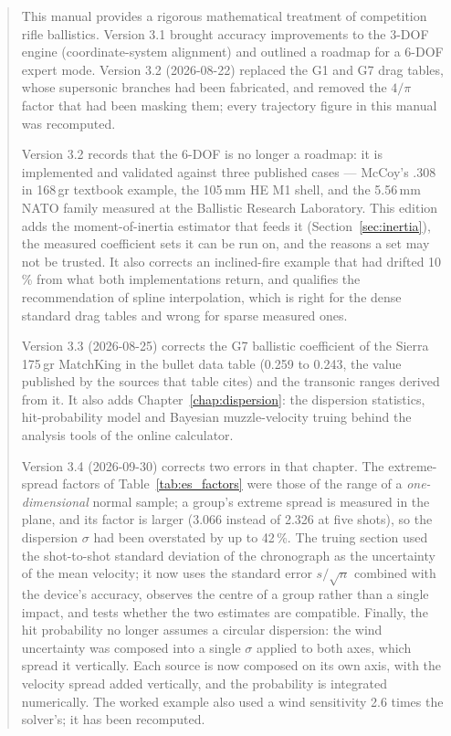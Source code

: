 \documentclass[11pt,twoside,openright]{report}
\begin{document}
\begin{abstract}
This manual provides a rigorous mathematical treatment of competition rifle ballistics. Version 3.1 brought accuracy improvements to the 3-DOF engine (coordinate-system alignment) and outlined a roadmap for a 6-DOF expert mode. Version 3.2 (2026-08-22) replaced the G1 and G7 drag tables, whose supersonic branches had been fabricated, and removed the $4/\pi$ factor that had been masking them; every trajectory figure in this manual was recomputed.

Version 3.2 records that the 6-DOF is no longer a roadmap: it is implemented and validated against three published cases --- McCoy's .308\,in 168\,gr textbook example, the 105\,mm HE M1 shell, and the 5.56\,mm NATO family measured at the Ballistic Research Laboratory. This edition adds the moment-of-inertia estimator that feeds it (Section~\ref{sec:inertia}), the measured coefficient sets it can be run on, and the reasons a set may not be trusted. It also corrects an inclined-fire example that had drifted 10\,\% from what both implementations return, and qualifies the recommendation of spline interpolation, which is right for the dense standard drag tables and wrong for sparse measured ones.

Version 3.3 (2026-08-25) corrects the G7 ballistic coefficient of the Sierra 175\,gr MatchKing in the bullet data table (0.259 to 0.243, the value published by the sources that table cites) and the transonic ranges derived from it. It also adds Chapter~\ref{chap:dispersion}: the dispersion statistics, hit-probability model and Bayesian muzzle-velocity truing behind the analysis tools of the online calculator.

Version 3.4 (2026-09-30) corrects two errors in that chapter. The extreme-spread factors of Table~\ref{tab:es_factors} were those of the range of a \emph{one-dimensional} normal sample; a group's extreme spread is measured in the plane, and its factor is larger (3.066 instead of 2.326 at five shots), so the dispersion $\sigma$ had been overstated by up to 42\,\%. The truing section used the shot-to-shot standard deviation of the chronograph as the uncertainty of the mean velocity; it now uses the standard error $s/\sqrt{n}$ combined with the device's accuracy, observes the centre of a group rather than a single impact, and tests whether the two estimates are compatible. Finally, the hit probability no longer assumes a circular dispersion: the wind uncertainty was composed into a single $\sigma$ applied to both axes, which spread it vertically. Each source is now composed on its own axis, with the velocity spread added vertically, and the probability is integrated numerically. The worked example also used a wind sensitivity 2.6 times the solver's; it has been recomputed.


\end{abstract}
\end{document}
